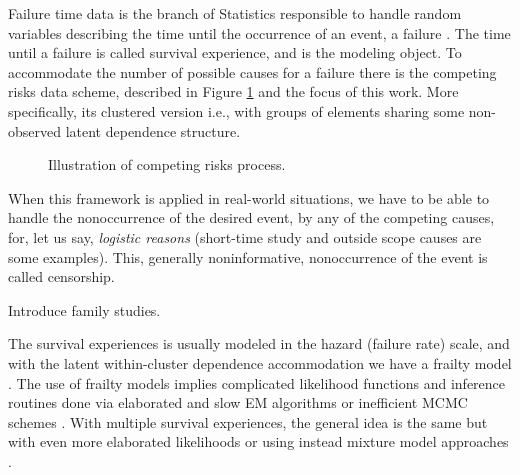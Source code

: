 \documentclass[a4paper,12pt]{article}
\begin{document}
Failure time data is the branch of Statistics responsible to handle
random variables describing the time until the occurrence of an event, a
failure \citep{kalb&prentice,hougaard00}. The time until a failure is
called survival experience, and is the modeling object. To accommodate
the number of possible causes for a failure there is the competing risks
data scheme, described in Figure \ref{fig:crp} and the focus of this
work. More specifically, its clustered version i.e., with groups of
elements sharing some non-observed latent dependence structure.

\begin{figure}[H]
 \centering
 \caption{Illustration of competing risks process.}
 \label{fig:crp}
\end{figure}

When this framework is applied in real-world situations, we have to be able to handle the nonoccurrence of the desired event, by any of the competing causes, for, let us say, \textit{logistic reasons} (short-time study and outside scope causes are some examples). This, generally noninformative, nonoccurrence of the event is called censorship.

Introduce family studies.

The survival experiences is usually modeled in the hazard (failure rate)
scale, and with the latent within-cluster dependence accommodation we
have a frailty model \citep{frailty78,frailty79,liang95,petersen98}. The
use of frailty models implies complicated likelihood functions and
inference routines done via elaborated and slow EM algorithms
\citep{nielsen92,klein92} or inefficient MCMC schemes
\citep{hougaard00}. With multiple survival experiences, the general idea
is the same but with even more elaborated likelihoods
\citep{prentice78,therneau00} or using instead mixture model approaches
\citep{larson85,kuk92}.
\end{document}

